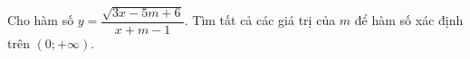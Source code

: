 \begin{ex}
Cho hàm số $y=\dfrac{\sqrt{3x-5m+6}}{x+m-1}$. Tìm tất cả các giá trị của $m$ để hàm số xác định trên $(0;+\infty)$.
\end{ex}
